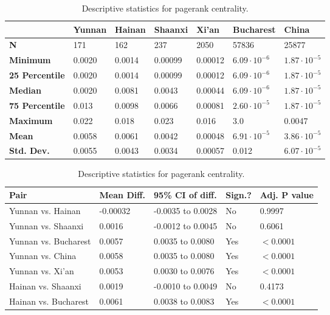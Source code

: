 \begin{table}[h]
	\begin{mdframed}
		\begin{tabular*}{\linewidth}{l|llllll}
			\hline
			\textbf{ } & \textbf{Yunnan} & \textbf{Hainan} & \textbf{Shaanxi} & \textbf{Xi'an} & \textbf{Bucharest} & \textbf{China}\\
			\hline
			\textbf{N} & 171 & 162 & 237 & 2050 & 57836 & 25877\\
			\textbf{Minimum} & 0.0020 & 0.0014 & 0.00099 & 0.00012 & $6.09\cdot 10^{-6}$ & $1.87\cdot 10^{-5}$\\
			\textbf{25 Percentile} & 0.0020 & 0.0014 & 0.00099 & 0.00012 & $6.09\cdot 10^{-6}$ & $1.87\cdot 10^{-5}$\\
			\textbf{Median} & 0.0020 & 0.0081 & 0.0043 & 0.00044 & $6.09\cdot 10^{-6}$ & $1.87\cdot 10^{-5}$\\
			\textbf{75 Percentile} & 0.013 & 0.0098 & 0.0066 & 0.00081 & $2.60\cdot 10^{-5}$ & $1.87\cdot 10^{-5}$\\
			\textbf{Maximum} & 0.022 & 0.018 & 0.023 & 0.016 & 3.0 & 0.0047\\
			\textbf{Mean} & 0.0058 & 0.0061 & 0.0042 & 0.00048 & $6.91\cdot 10^{-5}$ & $3.86\cdot 10^{-5}$\\
			\textbf{Std. Dev.} & 0.0055 & 0.0043 & 0.0034 & 0.00057 & 0.012 & $6.07\cdot 10^{-5}$\\
			\hline
		\end{tabular*}
		\caption{Descriptive statistics for pagerank centrality.}
		\label{tab:pagerank_centrality_desc}
		\vskip 10pt
		\small
		\begin{tabular*}{\linewidth}{l|llll}
			\hline
			\textbf{Pair} & \textbf{Mean Diff.} & \textbf{95\% CI of diff.} & \textbf{Sign.?} & \textbf{Adj. P value}\\
			\hline
			Yunnan vs. Hainan & -0.00032 & -0.0035 to 0.0028 & No & 0.9997\\
			Yunnan vs. Shaanxi & 0.0016 & -0.0012 to 0.0045 & No & 0.6061\\
			Yunnan vs. Bucharest & 0.0057 & 0.0035 to 0.0080 & Yes & $<0.0001$\\
			Yunnan vs. China & 0.0058 & 0.0035 to 0.0080 & Yes & $<0.0001$\\
			Yunnan vs. Xi'an & 0.0053 & 0.0030 to 0.0076 & Yes & $<0.0001$\\
			Hainan vs. Shaanxi & 0.0019 & -0.0010 to 0.0049 & No & 0.4173\\
			Hainan vs. Bucharest & 0.0061 & 0.0038 to 0.0083 & Yes & $<0.0001$\\

\end{tabular*}
\end{mdframed}
\end{table}
